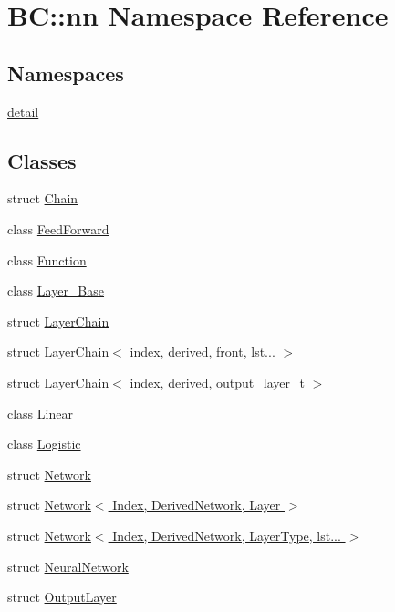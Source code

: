 \hypertarget{namespaceBC_1_1nn}{}\section{BC\+:\+:nn Namespace Reference}
\label{namespaceBC_1_1nn}
\subsection*{Namespaces}
\begin{DoxyCompactItemize}
\item 
 \hyperlink{namespaceBC_1_1nn_1_1detail}{detail}
\end{DoxyCompactItemize}
\subsection*{Classes}
\begin{DoxyCompactItemize}
\item 
struct \hyperlink{structBC_1_1nn_1_1Chain}{Chain}
\item 
class \hyperlink{classBC_1_1nn_1_1FeedForward}{Feed\+Forward}
\item 
class \hyperlink{classBC_1_1nn_1_1Function}{Function}
\item 
class \hyperlink{classBC_1_1nn_1_1Layer__Base}{Layer\+\_\+\+Base}
\item 
struct \hyperlink{structBC_1_1nn_1_1LayerChain}{Layer\+Chain}
\item 
struct \hyperlink{structBC_1_1nn_1_1LayerChain_3_01index_00_01derived_00_01front_00_01lst_8_8_8_01_4}{Layer\+Chain$<$ index, derived, front, lst... $>$}
\item 
struct \hyperlink{structBC_1_1nn_1_1LayerChain_3_01index_00_01derived_00_01output__layer__t_01_4}{Layer\+Chain$<$ index, derived, output\+\_\+layer\+\_\+t $>$}
\item 
class \hyperlink{classBC_1_1nn_1_1Linear}{Linear}
\item 
class \hyperlink{classBC_1_1nn_1_1Logistic}{Logistic}
\item 
struct \hyperlink{structBC_1_1nn_1_1Network}{Network}
\item 
struct \hyperlink{structBC_1_1nn_1_1Network_3_01Index_00_01DerivedNetwork_00_01Layer_01_4}{Network$<$ Index, Derived\+Network, Layer $>$}
\item 
struct \hyperlink{structBC_1_1nn_1_1Network_3_01Index_00_01DerivedNetwork_00_01LayerType_00_01lst_8_8_8_01_4}{Network$<$ Index, Derived\+Network, Layer\+Type, lst... $>$}
\item 
struct \hyperlink{structBC_1_1nn_1_1NeuralNetwork}{Neural\+Network}
\item 
struct \hyperlink{structBC_1_1nn_1_1OutputLayer}{Output\+Layer}
\end{DoxyCompactItemize}
